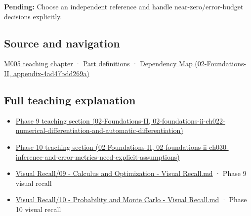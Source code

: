 \textbf{Pending:} Choose an independent reference and handle near-zero/error-budget decisions explicitly.

\subsection{Source and navigation}\label{appendix-3ae74e89b4e6-source-and-navigation}

\hyperref[01-foundations-i-ch001-when-arithmetic-meets-uncertainty]{M005 teaching chapter} · \hyperref[appendix-fd090d982a15-m005---parts-77-88]{Part definitions} · \href{../02-Foundations-II/main.pdf\#nameddest=appendix-4ad47bdd269a}{Dependency Map (02-Foundations-II, appendix-4ad47bdd269a)}

\subsection{Full teaching explanation}\label{appendix-3ae74e89b4e6-full-teaching-explanation}

\begin{itemize}
\tightlist
\item
  \href{../02-Foundations-II/main.pdf\#nameddest=02-foundations-ii-ch022-numerical-differentiation-and-automatic-differentiation}{Phase 9 teaching section (02-Foundations-II, 02-foundations-ii-ch022-numerical-differentiation-and-automatic-differentiation)}
\item
  \href{../02-Foundations-II/main.pdf\#nameddest=02-foundations-ii-ch030-inference-and-error-metrics-need-explicit-assumptions}{Phase 10 teaching section (02-Foundations-II, 02-foundations-ii-ch030-inference-and-error-metrics-need-explicit-assumptions)}
\item
  \hyperref[appendix-adf48f5dc5c1]{Visual Recall/09 - Calculus and Optimization - Visual Recall.md} · Phase 9 visual recall
\item
  \hyperref[appendix-cb5af353ef77]{Visual Recall/10 - Probability and Monte Carlo - Visual Recall.md} · Phase 10 visual recall
\end{itemize}
